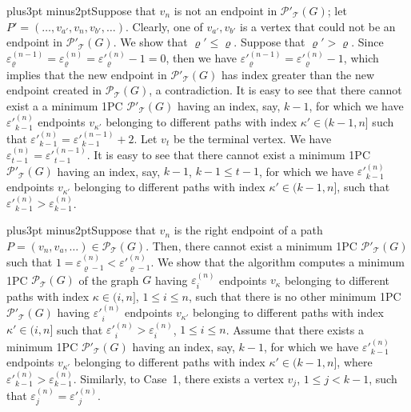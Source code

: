 \documentclass[10pt]{article}
\def\yskip{\penalty-50\vskip3pt plus3pt minus2pt}
\def\y{\yskip}
\begin{document}
{\y Suppose that $v_n$ is not an endpoint in
$\mathcal{P'_{\mathcal{T}}}(G)$; let $P'=(\ldots, v_{a'}, v_n,
v_{b'}, \ldots)$. Clearly, one of $v_{a'}, v_{b'}$ is a vertex
that could not be an endpoint in $\mathcal{P'_{\mathcal{T}}}(G)$.
We show that $\varrho' \leq \varrho$. Suppose that $\varrho'
> \varrho$. Since $\varepsilon^{(n-1)}_\varrho=\varepsilon^{(n)}_\varrho=\varepsilon'^{(n)}_\varrho-1=0$,
then we have
$\varepsilon'^{(n-1)}_\varrho=\varepsilon'^{(n)}_\varrho-1$, which
implies that the new endpoint in $\mathcal{P'_{\mathcal{T}}}(G)$
has index greater than the new endpoint created in
$\mathcal{P_{\mathcal{T}}}(G)$, a contradiction. It is easy to see
that there cannot exist a a minimum 1PC
$\mathcal{P'_{\mathcal{T}}}(G)$ having an index, say, $k-1$, for
which we have $\varepsilon'^{(n)}_{k-1}$ endpoints $v_{\kappa'}$
belonging to different paths with index $\kappa' \in (k-1,n]$ such
that $\varepsilon'^{(n)}_{k-1}=\varepsilon'^{(n-1)}_{k-1}+2$. Let
$v_t$ be the terminal vertex. We have
$\varepsilon^{(n)}_{t-1}=\varepsilon'^{(n-1)}_{t-1}$. It is easy
to see that there cannot exist a minimum 1PC
$\mathcal{P'_{\mathcal{T}}}(G)$ having an index, say, $k-1$, $k-1
\leq t-1$, for which we have $\varepsilon'^{(n)}_{k-1}$ endpoints
$v_{\kappa'}$ belonging to different paths with index $\kappa' \in
(k-1,n]$, such that
$\varepsilon'^{(n)}_{k-1}>\varepsilon^{(n)}_{k-1}$.

\y Suppose that $v_n$ is the right endpoint of a path $P=(v_n,
v_a, \ldots) \in \mathcal{P_{\mathcal{T}}}(G)$. Then, there cannot
exist a minimum 1PC $\mathcal{P'_{\mathcal{T}}}(G)$ such that $1=
\varepsilon^{(n)}_{\varrho-1} < \varepsilon'^{(n)}_{\varrho-1}$.
We show that the algorithm computes a minimum 1PC
$\mathcal{P_{\mathcal{T}}}(G)$ of the graph $G$ having
$\varepsilon^{(n)}_i$ endpoints $v_\kappa$ belonging to different
paths with index $\kappa \in (i,n]$, $1 \leq i \leq n$, such that
there is no other minimum 1PC $\mathcal{P'_{\mathcal{T}}}(G)$
having $\varepsilon'^{(n)}_i$ endpoints $v_{\kappa'}$ belonging to
different paths with index $\kappa' \in (i,n]$ such that
$\varepsilon'^{(n)}_i>\varepsilon^{(n)}_i$, $1 \leq i \leq n$.
Assume that there exists a minimum 1PC
$\mathcal{P'_{\mathcal{T}}}(G)$ having an index, say, $k-1$, for
which we have $\varepsilon'^{(n)}_{k-1}$ endpoints $v_{\kappa'}$
belonging to different paths with index $\kappa' \in (k-1,n]$,
where $\varepsilon'^{(n)}_{k-1}>\varepsilon^{(n)}_{k-1}$.
Similarly, to Case~1, there exists a vertex $v_j$, $1 \leq j <
k-1$, such that $\varepsilon^{(n)}_j = \varepsilon'^{(n)}_j$.

}
\end{document}
